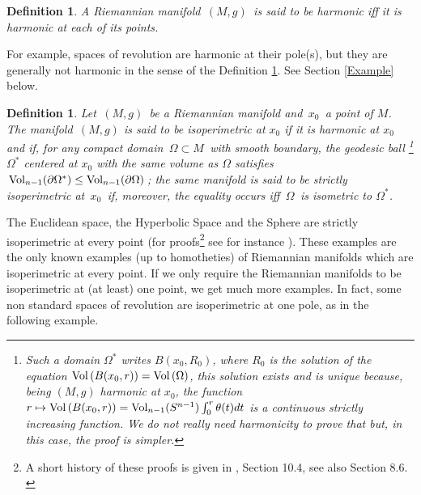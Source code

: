 \documentclass[11pt, reqno]{amsart}
\newtheorem{definition}[theoreme]{Definition}
\theoremstyle{plain}
\begin{document}
\begin{definition}\label{harmonic}
A Riemannian manifold $\, (M,g)\,$ is said to be {\em harmonic} iff it is
harmonic at each of its points.
\end{definition}

For example, spaces of revolution are  harmonic at their pole(s),
but they are generally not harmonic in the sense of the Definition \ref{harmonic}. See Section  \ref{Example} below.

\begin{definition}\label{isoperimetre}
Let $\,(M, g)\,$ be a Riemannian manifold and $\,x_0\,$ a point of $M$. 
The manifold $\,(M,g)$ is said to be {\em isoperimetric at $x_0$}  if it is  harmonic at $x_0$  and if, for any compact
domain $\,\Omega \subset M\,$ with smooth boundary, the geodesic ball 
\footnote{Such a domain $\Omega^*$ writes $B(x_0 , R_0)$, where $R_0$ is
the solution of the equation ${\rm Vol} \left(B(x_0 , r ) \right) =  {\rm Vol} \left( \Omega \right)$, this solution 
exists and is unique because, being $(M, g)$ harmonic at $x_0$, the function 
$r\mapsto {\rm Vol} \left(B(x_0 , r ) \right)={\rm Vol}_{n-1}(S^{n-1})\int_0^r\theta (t)dt$
 is a continuous strictly increasing function. We do not really need harmonicity to prove that but, in this case, the proof is simpler.} 
$\Omega^*$ centered at $x_0$ with the same volume as $\Omega$ satisfies $\, {\rm Vol}_{n-1}(\partial \Omega^*) \le {\rm Vol}_{n-1}(\partial \Omega)\,$;
the same manifold is said to be {\em strictly isoperimetric at $\,x_0\,$}  if, moreover, the equality occurs iff $\,\Omega\,$ is isometric to $\Omega^*$.
\end{definition}

The Euclidean space, the  Hyperbolic Space and the Sphere are strictly isoperimetric 
at every point  (for proofs\footnote{A short history of these
proofs is given in \cite{B-Z}, Section 10.4, see also Section 8.6.\\} see for instance \cite{B-Z}).
These examples  are the only known examples (up to homotheties) of Riemannian manifolds 
which are isoperimetric at every point.
If we only require the  Riemannian manifolds to be isoperimetric at (at least)
one point, we get much more examples. 
In fact, some non standard spaces of revolution 
are isoperimetric at one pole, as in the following  example.
\end{document}
